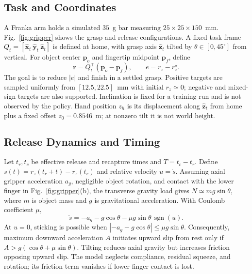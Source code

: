 \documentclass[letterpaper,10pt,conference]{ieeeconf}
\newcommand{\vect}[1]{\bm{#1}}
\newcommand{\axis}{\hat{\vect z}_t}
\newcommand{\sgn}{\operatorname{sgn}}
\begin{document}
\subsection{Task and Coordinates}
A Franka arm holds a simulated $35$~g bar measuring $25\times25\times150$~mm. Fig.~\ref{fig:gripper} shows the grasp and release configurations. A fixed task frame $Q_t=[\hat{\vect x}_t\ \hat{\vect y}_t\ \axis]$ is defined at home, with grasp axis $\axis$ tilted by $\theta\in[0,45^\circ]$ from vertical. For object center $\vect p_o$ and fingertip midpoint $\vect p_f$, define
\begin{equation}
 \vect r=Q_t^\top(\vect p_o-\vect p_f),\qquad e=r_z-r_z^\star.
 \label{eq:relative}
\end{equation}
The goal is to reduce $|e|$ and finish in a settled grasp. Positive targets are sampled uniformly from $[12.5,22.5]$~mm with initial $r_z\simeq0$; negative and mixed-sign targets are also supported. Inclination is fixed for a training run and is not observed by the policy. Hand position $z_h$ is its displacement along $\axis$ from home plus a fixed offset $z_0=0.8546$~m; at nonzero tilt it is not world height.

\subsection{Release Dynamics and Timing}
Let $t_r,t_c$ be effective release and recapture times and $T=t_c-t_r$. Define $s(t)=r_z(t_r+t)-r_z(t_r)$ and relative velocity $u=\dot s$. Assuming axial gripper acceleration $a_g$, negligible object rotation, and contact with the lower finger in Fig.~\ref{fig:gripper}(b), the transverse gravity load gives $N\simeq mg\sin\theta$, where $m$ is object mass and $g$ is gravitational acceleration. With Coulomb coefficient $\mu$,
\begin{equation}
 \ddot s=-a_g-g\cos\theta-\mu g\sin\theta\,\sgn(u).
 \label{eq:dynamics}
\end{equation}
At $u=0$, sticking is possible when $|-a_g-g\cos\theta|\leq\mu g\sin\theta$. Consequently, maximum downward acceleration $A$ initiates upward slip from rest only if $A>g(\cos\theta+\mu\sin\theta)$. Tilting reduces axial gravity but increases friction opposing upward slip. The model neglects compliance, residual squeeze, and rotation; its friction term vanishes if lower-finger contact is lost.
\end{document}
